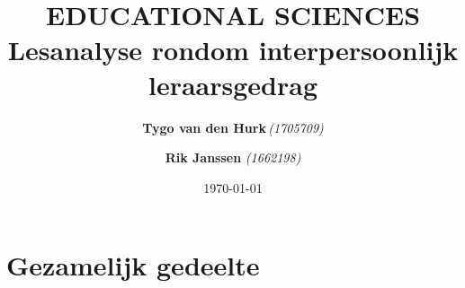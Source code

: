 \documentclass{article}
\title{ 
    \normalsize 
    \textsc{} \\
    [2.0cm]
    \HRule{1.5pt} \\
    \LARGE \textbf{
        \uppercase{
            Educational sciences}
    \HRule{2.0pt} \\ 
    [0.6cm] 
    \LARGE{
        Lesanalyse rondom interpersoonlijk leraarsgedrag} 
    \vspace*{
        10\baselineskip}}
}
\date{\today}
\author{
    \textbf{Tygo van den Hurk}\,\orcidlink{0009-0003-4182-5076}\textit{(1705709)} \and
    \textbf{Rik Janssen} \textit{(1662198)}
}
\begin{document}
    \maketitle 
    \newpage
    \clearpage
    \tableofcontents
    \clearpage
    \newpage
    \section{Gezamelijk gedeelte}
\end{document}
